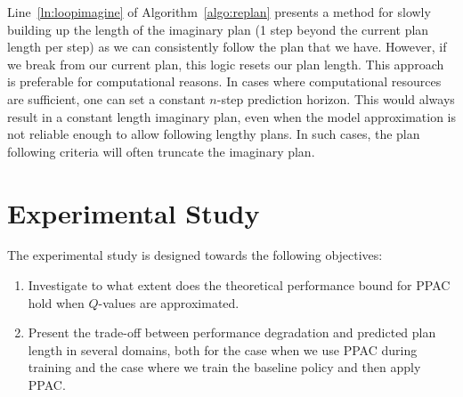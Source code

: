 \documentclass{article}
\DeclareMathOperator*{\argmax}{arg\,max}
\newcommand{\JC}[1] {{\color{blue} \textbf{[JC]: #1}}}
\begin{document}

        Line~\ref{ln:loopimagine} of Algorithm~\ref{algo:replan} presents a method for slowly building up the length of the imaginary plan (1 step beyond the current plan length per step) as we can consistently follow the plan that we have. However, if we break from our current plan, this logic resets our plan length. This approach is preferable for computational reasons. In cases where computational resources are sufficient, one can set a constant $n$-step prediction horizon. This would always result in a constant length imaginary plan, even when the model approximation is not reliable enough to allow following lengthy plans. In such cases, the plan following criteria will often truncate the imaginary plan.  


    \section{Experimental Study} 



        The experimental study is designed towards the following objectives:
        \begin{enumerate}
            \item Investigate to what extent does the theoretical performance bound for PPAC hold when $Q$-values are approximated.
            
            \item Present the trade-off between performance degradation and predicted plan length in several domains, both for the case when we use PPAC during training and the case where we train the baseline policy and then apply PPAC. 
        \end{enumerate}
\end{document}
